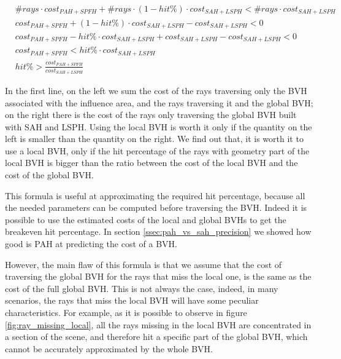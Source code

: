 \documentclass{PoliMi_MasterThesis}
\begin{document}
\begin{subequations}
	\begin{align*}
		&\#rays \cdot cost_{PAH+SPFH} + \#rays \cdot (1-hit\%) \cdot cost_{SAH+LSPH} < \#rays \cdot cost_{SAH+LSPH}\\
		&cost_{PAH+SPFH} + (1-hit\%) \cdot cost_{SAH+LSPH} - cost_{SAH+LSPH} < 0\\
		&cost_{PAH+SPFH} - hit\% \cdot cost_{SAH+LSPH} + cost_{SAH+LSPH} - cost_{SAH+LSPH} < 0\\
		&cost_{PAH+SPFH} < hit\% \cdot cost_{SAH+LSPH}\\
		&hit\% > \frac{cost_{PAH+SPFH}}{cost_{SAH+LSPH}}
	\end{align*}
\end{subequations}

In the first line, on the left we sum the cost of the rays traversing only the BVH associated with the influence area, and the rays traversing it and the global BVH; on the right there is the cost of the rays only traversing the global BVH built with SAH and LSPH. Using the local BVH is worth it only if the quantity on the left is smaller than the quantity on the right. We find out that, it is worth it to use a local BVH, only if the hit percentage of the rays with geometry part of the local BVH is bigger than the ratio between the cost of the local BVH and the cost of the global BVH.

This formula is useful at approximating the required hit percentage, because all the needed parameters can be computed before traversing the BVH. Indeed it is possible to use the estimated costs of the local and global BVHs to get the breakeven hit percentage. In section \ref{ssec:pah_vs_sah_precision} we showed how good is PAH at predicting the cost of a BVH.

However, the main flaw of this formula is that we assume that the cost of traversing the global BVH for the rays that miss the local one, is the same as the cost of the full global BVH. This is not always the case, indeed, in many scenarios, the rays that miss the local BVH will have some peculiar characteristics. For example, as it is possible to observe in figure \ref{fig:ray_missing_local}, all the rays missing in the local BVH are concentrated in a section of the scene, and therefore hit a specific part of the global BVH, which cannot be accurately approximated by the whole BVH.
\end{document}
